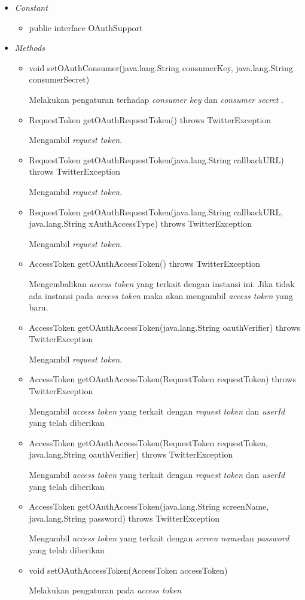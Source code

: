 	\begin{itemize}
		\item \textit{Constant}
		
			\begin{itemize}
				\item public interface OAuthSupport
			\end{itemize}
		\item \textit{Methods}
		
		\begin{itemize}
			\item void setOAuthConsumer(java.lang.String consumerKey, java.lang.String consumerSecret)
			
			Melakukan pengaturan terhadap \textit{consumer key} dan \textit{consumer secret }.
			\item RequestToken getOAuthRequestToken() throws TwitterException
			
			Mengambil \textit{request token}.
			\item RequestToken getOAuthRequestToken(java.lang.String callbackURL) throws TwitterException
			
			
			Mengambil \textit{request token}.
			\item RequestToken getOAuthRequestToken(java.lang.String callbackURL, java.lang.String xAuthAccessType) throws TwitterException
			
			Mengambil \textit{request token}.
			\item AccessToken getOAuthAccessToken() throws TwitterException
			
			Mengembalikan \textit{access token} yang terkait dengan instansi ini. Jika tidak ada instansi pada \textit{access token} maka akan mengambil \textit{access token} yang baru.
			\item AccessToken getOAuthAccessToken(java.lang.String oauthVerifier) throws TwitterException
			
			Mengambil \textit{request token}.
			\item AccessToken getOAuthAccessToken(RequestToken requestToken) throws TwitterException
			
			Mengambil \textit{access token} yang terkait dengan \textit{request token }dan \textit{userId} yang telah diberikan
			\item AccessToken getOAuthAccessToken(RequestToken requestToken, java.lang.String oauthVerifier) throws TwitterException
			
			Mengambil \textit{access token} yang terkait dengan \textit{request token }dan \textit{userId} yang telah diberikan
			\item AccessToken getOAuthAccessToken(java.lang.String screenName, java.lang.String password) throws TwitterException
			
			Mengambil \textit{access token} yang terkait dengan \textit{screen name}dan \textit{password} yang telah diberikan
			\item void setOAuthAccessToken(AccessToken accessToken)
			
			Melakukan pengaturan pada \textit{access token}
		\end{itemize}
	\end{itemize}

